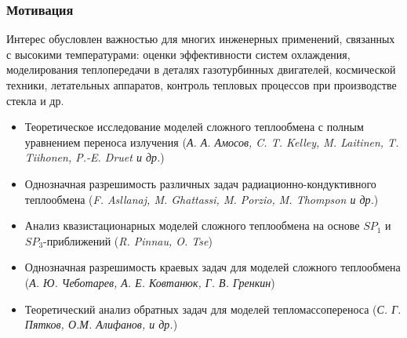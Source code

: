 \begin{frame}
    \setcounter{framenumber}{1}
    \maketitle
\end{frame}


\begin{frame}
    \frametitle{Мотивация}
    Интерес обусловлен важностью для многих
    инженерных применений, связанных с высокими температурами: оценки
    эффективности систем охлаждения, моделирования теплопередачи в деталях
    газотурбинных двигателей, космической техники, летательных аппаратов,
    контроль тепловых процессов при производстве стекла и др.

    \hfill
    \hfill
    \begin{itemize}
        \item Теоретическое исследование моделей сложного теплообмена с
        полным уравнением переноса излучения
        (\textit{А. А. Амосов, C. T. Kelley, M. Laitinen, T. Tiihonen, P.-E. Druet и др.})
        \item Однозначная разрешимость различных задач радиационно-кондуктивного теплообмена
        (\textit{F. Asllanaj, M. Ghattassi, M. Porzio, M. Thompson и др.})
        \item Анализ квазистационарных моделей сложного теплообмена на основе $SP_1$ и $SP_3$-приближений
        (\textit{R. Pinnau, O. Tse})
        \item Однозначная разрешимость краевых задач для моделей сложного теплообмена
        (\textit{А. Ю. Чеботарев, А. Е. Ковтанюк, Г. В. Гренкин})
        \item Теоретический анализ обратных задач для моделей тепломассопереноса
        (\textit{С. Г. Пятков, О.М. Алифанов, и др.})
    \end{itemize}
\end{frame}

